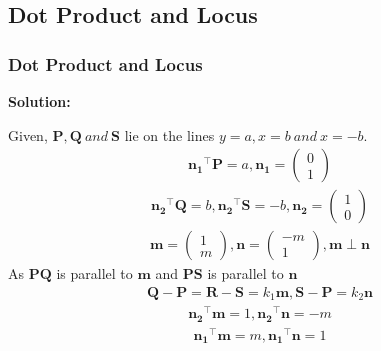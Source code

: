 \documentclass{beamer}
\theoremstyle{remark}
\newcommand{\myvec}[1]{\ensuremath{\begin{pmatrix}#1\end{pmatrix}}}
\let\vec\mathbf
\numberwithin{equation}{section}
\begin{document}
\subsection{ Dot Product  and Locus}
\begin{frame}
\frametitle{Dot Product and Locus}
\textbf{Solution:}

Given,
$\vec{P}, \vec{Q} \ and \ \vec{S}$ lie on the lines $y = a, x = b \ and \ x = -b .$
\begin{align}
\vec{n_1}^\top\vec{P}=a , \vec{n_1}=\myvec{0\\1}
\end{align}
\begin{align}
\vec{n_2}^\top\vec{Q}=b , \vec{n_2}^\top\vec{S}=-b , \vec{n_2}=\myvec{1\\0}
\end{align}
\begin{align}
\vec{m}=\myvec{1\\m} , \vec{n}=\myvec{-m\\1} , \vec{m} \perp \vec{n}
\end{align}
As $\vec{P}\vec{Q}$ is parallel to $\vec{m}$ and $\vec{P}\vec{S}$ is parallel to $\vec{n}$
\begin{align}
\vec{Q}-\vec{P}=\vec{R}-\vec{S}=k_1\vec{m} , \vec{S}-\vec{P}=k_2\vec{n}
\end{align}
\begin{align}
\vec{n_2}^\top\vec{m}=1 , \vec{n_2}^\top\vec{n}=-m 
\end{align}
\begin{align}
\vec{n_1}^\top\vec{m}=m , \vec{n_1}^\top\vec{n}=1
\end{align}
\end{frame}
\end{document}
